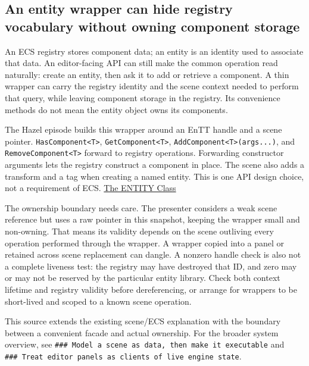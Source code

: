 \subsection{An entity wrapper can hide registry vocabulary without owning component storage}\label{06-engine-ii-ch031-an-entity-wrapper-can-hide-registry-vocabulary-without-owning-component-storage}

An ECS registry stores component data; an entity is an identity used to associate that data. An editor-facing API can still make the common operation read naturally: create an entity, then ask it to add or retrieve a component. A thin wrapper can carry the registry identity and the scene context needed to perform that query, while leaving component storage in the registry. Its convenience methods do not mean the entity object owns its components.

The Hazel episode builds this wrapper around an EnTT handle and a scene pointer. \texttt{HasComponent\textless{}T\textgreater{}}, \texttt{GetComponent\textless{}T\textgreater{}}, \texttt{AddComponent\textless{}T\textgreater{}(args...)}, and \texttt{RemoveComponent\textless{}T\textgreater{}} forward to registry operations. Forwarding constructor arguments lets the registry construct a component in place. The scene also adds a transform and a tag when creating a named entity. This is one API design choice, not a requirement of ECS. \href{https://www.youtube.com/watch?v=GfSzeAcsBb0}{The ENTITY Class}

The ownership boundary needs care. The presenter considers a weak scene reference but uses a raw pointer in this snapshot, keeping the wrapper small and non-owning. That means its validity depends on the scene outliving every operation performed through the wrapper. A wrapper copied into a panel or retained across scene replacement can dangle. A nonzero handle check is also not a complete liveness test: the registry may have destroyed that ID, and zero may or may not be reserved by the particular entity library. Check both context lifetime and registry validity before dereferencing, or arrange for wrappers to be short-lived and scoped to a known scene operation.

This source extends the existing scene/ECS explanation with the boundary between a convenient facade and actual ownership. For the broader system overview, see \texttt{\#\#\#\ Model\ a\ scene\ as\ data,\ then\ make\ it\ executable} and \texttt{\#\#\#\ Treat\ editor\ panels\ as\ clients\ of\ live\ engine\ state}.


